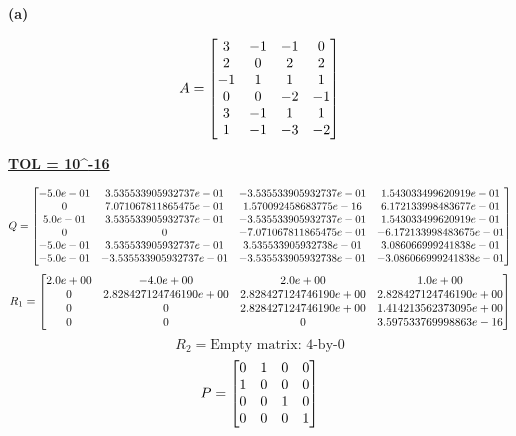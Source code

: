\documentclass[final,12pt,reqno]{amsart}
\begin{document}
\thispagestyle{fancy}

\textbf{(a)}

\[
A =
\left[\begin{array}{@{}*{4}{c}@{}}
  3 & -1 & -1 & 0\\
	2 & 0 & 2 & 2\\
	-1 & 1 & 1 & 1\\
	0 & 0 & -2 & -1\\
	3 & -1 & 1 & 1\\
	1 & -1 & -3 & -2
  \end{array} \right]
\]

\textbf{\underline{TOL = 10^{-16}}}

\[
Q =
\left[\begin{array}{@{}*{4}{c}@{}}
    -5.0e-01&     3.535533905932737e-01&    -3.535533905932737e-01&     1.543033499620919e-01\\
                         0&     7.071067811865475e-01&     1.570092458683775e-16&     6.172133998483677e-01\\
     5.0e-01&     3.535533905932737e-01&    -3.535533905932737e-01&     1.543033499620919e-01\\
                         0&                         0&    -7.071067811865475e-01&    -6.172133998483675e-01\\
    -5.0e-01&     3.535533905932737e-01&     3.535533905932738e-01&     3.086066999241838e-01\\
    -5.0e-01&    -3.535533905932737e-01&    -3.535533905932738e-01&    -3.086066999241838e-01
  \end{array} \right]
\]
\[
R_1 =
\left[\begin{array}{@{}*{4}{c}@{}}
     2.0e+00&    -4.0e+00&     2.0e+00&     1.0e+00\\
                         0&     2.828427124746190e+00&     2.828427124746190e+00&     2.828427124746190e+00\\
                         0&                         0&     2.828427124746190e+00&     1.414213562373095e+00\\
                         0&                         0&                         0&     3.597533769998863e-16
  \end{array} \right]
\]
\[
R_2 = \text{Empty matrix: 4-by-0}
\]
\[
P = 
\left[\begin{array}{@{}*{4}{c}@{}}
     0&     1&     0&     0\\
     1&     0&     0&     0\\
     0&     0&     1&     0\\
     0&     0&     0&     1
  \end{array} \right]
\]
\end{document}
